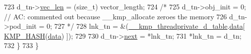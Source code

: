 \begin{DoxyCode}
723         d\_tn->\hyperlink{structshared__common_ae2761da4a704f4f2f377854538ba153c}{vec\_len} = (size\_t) vector\_length;
724 \textcolor{comment}{/*}
725 \textcolor{comment}{        d\_tn->obj\_init = 0;  // AC: commented out because \_\_kmp\_allocate zeroes the memory}
726 \textcolor{comment}{        d\_tn->pod\_init = 0;}
727 \textcolor{comment}{*/}
728         lnk\_tn = &(\hyperlink{kmp__threadprivate_8c_ac5d665dbab9923a586d0069f809fb1b0}{\_\_kmp\_threadprivate\_d\_table}.\hyperlink{structshared__table_acbe02cd3db1cddd2f658db7e64c2bfc5}{data}[ 
      \hyperlink{kmp_8h_a81fe0625f28faf8ec00b8cf7820e103b}{KMP\_HASH}(\hyperlink{ittnotify__static_8h_ae4b7aa9cddc8e1ade7c67ed7e338b18f}{data}) ]);
729 
730         d\_tn->\hyperlink{structshared__common_aa54da923f39ba340f472b4a62205b967}{next} = *lnk\_tn;
731         *lnk\_tn = d\_tn;
732     \}
733 \}
\end{DoxyCode}
